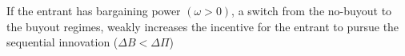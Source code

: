 \begin{proposition} \label{excessincentive}
If the entrant has bargaining power $(\omega>0)$, a switch from the no-buyout to the buyout regimes, weakly increases the incentive for the entrant to pursue the sequential innovation ($\Delta B<\Delta \Pi$)
\end{proposition}

